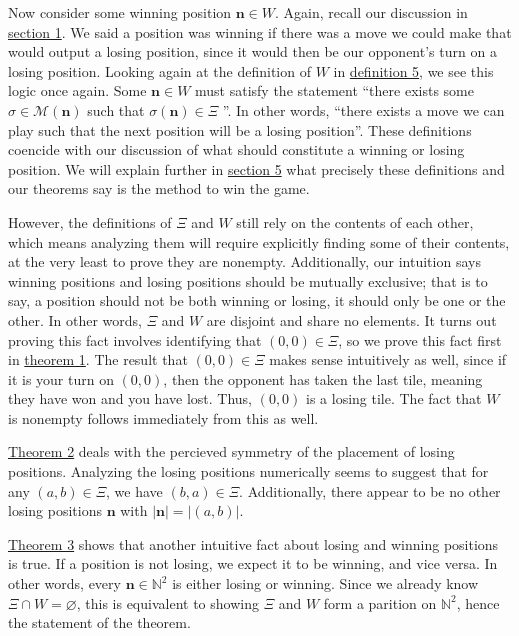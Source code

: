 \documentclass[11pt, letterpaper]{article}
\begin{document}
Now consider some winning position $\mathbf{n}\in W$. Again, recall our discussion in \hyperref[sec:1]{section 1}. We said a position was winning if there was a move we could make that would output a losing position, since it would then be our opponent's turn on a losing position. Looking again at the definition of $W$ in \hyperref[dfn:5]{definition 5}, we see this logic once again. Some $\mathbf{n}\in W$ must satisfy the statement ``there exists some $\sigma \in \mathscr{M} (\mathbf{n})$ such that $\sigma (\mathbf{n})\in \Xi $ ''. In other words, ``there exists a move we can play such that the next position will be a losing position''. These definitions coencide with our discussion of what should constitute a winning or losing position. We will explain further in \hyperref[sec:5]{section 5} what precisely these definitions and our theorems say is the method to win the game.

However, the definitions of $\Xi $ and $W$ still rely on the contents of each other, which means analyzing them will require explicitly finding some of their contents, at the very least to prove they are nonempty. Additionally, our intuition says winning positions and losing positions should be mutually exclusive; that is to say, a position should not be both winning or losing, it should only be one or the other. In other words,  $\Xi $ and $W$ are disjoint and share no elements. It turns out proving this fact involves identifying that $(0,0)\in \Xi $, so we prove this fact first in \hyperref[thm:1]{theorem 1}. The result that $(0,0)\in \Xi $ makes sense intuitively as well, since if it is your turn on $(0,0)$, then the opponent has taken the last tile, meaning they have won and you have lost. Thus, $(0,0)$ is a losing tile. The fact that $W$ is nonempty follows immediately from this as well.

\hyperref[thm:2]{Theorem 2} deals with the percieved symmetry of the placement of losing positions. Analyzing the losing positions numerically seems to suggest that for any $(a,b)\in \Xi $, we have $(b,a)\in \Xi $. Additionally, there appear to be no other losing positions $\mathbf{n}$ with $\left| \mathbf{n} \right| =\left| (a,b) \right| $.

\hyperref[thm:3]{Theorem 3} shows that another intuitive fact about losing and winning positions is true. If a position is not losing, we expect it to be winning, and vice versa. In other words, every $\mathbf{n}\in \mathbb{N}^2 $ is either losing or winning. Since we already know $\Xi \cap W=\varnothing$, this is equivalent to showing $\Xi $ and $W$ form a parition on $\mathbb{N}^2$, hence the statement of the theorem.
\end{document}
